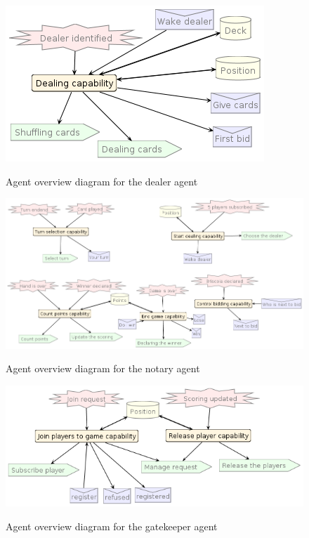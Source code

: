 \documentclass[a4paper]{article}
\begin{document}
\begin{figure}[htp]
  \includegraphics[keepaspectratio,scale=0.45]{pdt/images/detailed_design/dealer_overview_diagram.png}
  \label{fig:dealer}
  \caption{Agent overview diagram for the dealer agent}
\end{figure}
\begin{figure}[htp]
  \includegraphics[keepaspectratio,scale=0.45]{pdt/images/detailed_design/notary_overview_diagram.png}
  \label{fig:notary}
  \caption{Agent overview diagram for the notary agent}
\end{figure}
\begin{figure}[htp]
  \includegraphics[keepaspectratio,scale=0.45]{pdt/images/detailed_design/gatekeeper_overview_diagram.png}
  \label{fig:gatekeeper}
  \caption{Agent overview diagram for the gatekeeper agent}
\end{figure}
\end{document}
